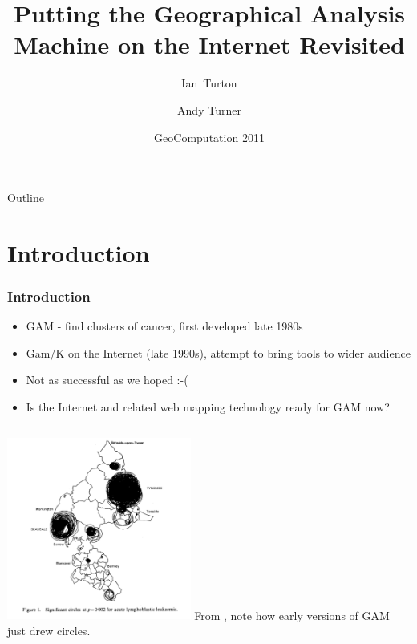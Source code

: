 \documentclass{beamer}
\title[GAM Revisited] %
{Putting the Geographical Analysis Machine on the Internet Revisited}
\author[Turton, Turner] %
{Ian~Turton\inst{1} \and Andy Turner\inst{2}}
\institute[ ] %
{
  \inst{1}%
Independent Researcher\\
 ijturton@gmail.com
  \and
  \inst{2}%
  Centre for Computational Geography\\
  University of Leeds\\
  A.G.D.Turner@leeds.ac.uk}
\date[ ] %
{GeoComputation 2011}
\begin{document}
\begin{frame}
  \titlepage
\end{frame}

\begin{frame}{Outline}
  \tableofcontents
\end{frame}


\section{Introduction}
\begin{frame}[t]
\frametitle{Introduction}
\begin{itemize}
\item GAM - find clusters of cancer, first developed late 1980s
\item Gam/K on the Internet (late 1990s), attempt to bring tools to wider audience
\item Not as successful as we hoped :-(
\item Is the Internet and related web mapping technology ready for GAM now?
\end{itemize}
\end{frame}
\begin{frame}
\begin{columns}
\includegraphics[height=6.0cm]{first_gam.png}
From \citet{citeulike:5207314}, note how early versions of GAM just drew circles.
\end{columns}
\end{frame}
\end{document}
